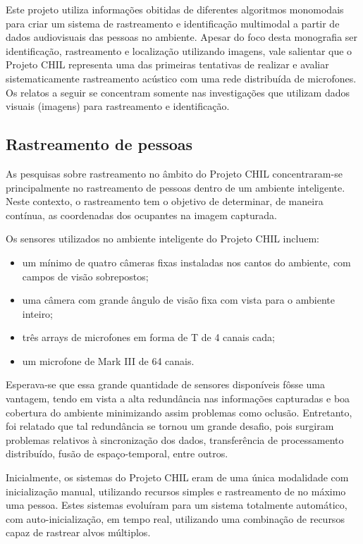 Este projeto utiliza informações obitidas de diferentes algoritmos monomodais para criar um sistema de rastreamento e identificação multimodal a partir de dados audiovisuais das pessoas no ambiente. Apesar do foco desta monografia ser identificação, rastreamento e localização utilizando imagens, vale salientar que o Projeto CHIL representa uma das primeiras tentativas de realizar e avaliar sistematicamente rastreamento acústico com uma rede distribuída de microfones. Os relatos a seguir se concentram somente nas investigações que utilizam dados visuais (imagens) para rastreamento e identificação. 

\subsection{Rastreamento de pessoas}

As pesquisas sobre rastreamento no âmbito do Projeto CHIL concentraram-se principalmente no rastreamento de pessoas dentro de um ambiente inteligente. Neste contexto, o rastreamento tem o objetivo de determinar,  de maneira contínua, as coordenadas dos ocupantes na imagem capturada.

Os sensores utilizados no ambiente inteligente do Projeto CHIL incluem:	
	\begin{itemize}
		\item um mínimo de quatro câmeras fixas instaladas nos cantos do ambiente, com campos de visão sobrepostos;
		\item uma câmera com grande ângulo de visão fixa com vista para o ambiente inteiro;
		\item três arrays de microfones em forma de T de 4 canais cada;
		\item um microfone de Mark III de 64 canais.
	\end{itemize}

Esperava-se que essa grande quantidade de sensores disponíveis fôsse uma vantagem, tendo em vista a alta redundância nas informações capturadas e boa cobertura do ambiente minimizando assim problemas como oclusão. Entretanto, foi relatado que tal redundância se tornou um grande desafio, pois surgiram problemas relativos à sincronização dos dados, transferência de processamento distribuído, fusão de espaço-temporal, entre outros.

Inicialmente, os sistemas do Projeto CHIL eram de uma única modalidade com inicialização manual, utilizando recursos simples e rastreamento de no máximo uma pessoa. Estes sistemas evoluíram para um sistema totalmente automático, com auto-inicialização, em tempo real, utilizando uma combinação de recursos capaz de rastrear alvos múltiplos.

